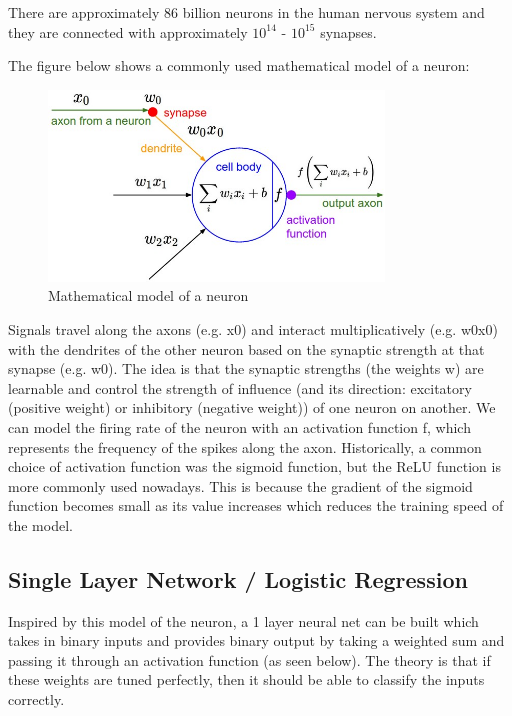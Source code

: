 \documentclass[twoside]{article}
\begin{document}
There are approximately 86 billion neurons in the human nervous system and they are connected with approximately $10^14$ - $10^15$ synapses\cite{cs231n-website}.

The figure below shows a commonly used mathematical model of a neuron:

\begin{figure}[!htb]
\centering
\includegraphics[height = 2in]{pics/neuron_model.jpeg}
\caption{Mathematical model of a neuron\cite{cs231n-website}}
\label{fig:neuron_model}
\end{figure}

Signals travel along the axons (e.g. x0) and interact multiplicatively (e.g. w0x0) with the dendrites of the other neuron based on the synaptic strength at that synapse (e.g. w0). The idea is that the synaptic strengths (the weights w) are learnable and control the strength of influence (and its direction: excitatory (positive weight) or inhibitory (negative weight)) of one neuron on another. We can model the firing rate of the neuron with an activation function f, which represents the frequency of the spikes along the axon. Historically, a common choice of activation function was the sigmoid function, but the ReLU function is more commonly used nowadays. This is because the gradient of the sigmoid function becomes small as its value increases which reduces the training speed of the model.


\subsection{Single Layer Network / Logistic Regression}
Inspired by this model of the neuron, a 1 layer neural net can be built which takes in binary inputs and provides binary output by taking a weighted sum and passing it through an activation function (as seen below). The theory is that if these weights are tuned perfectly, then it should be able to classify the inputs correctly.
\end{document}
